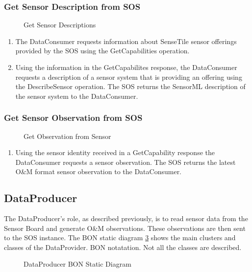 \documentclass[]{final_report}
\begin{document}
\subsubsection{Get Sensor Description from SOS}
\begin{figure}[h]
\centering
{}
\caption{Get Sensor Descriptions}\label{fig:GetMeta}
\end{figure}
 \begin{enumerate}
\item The DataConsumer requests information about SenseTile sensor offerings provided by the SOS using the GetCapabilities operation.
\item Using the information in the GetCapabilites response, the DataConsumer requests a description of a sensor system that is providing an offering using the DescribeSensor operation. The SOS returns the SensorML description of the sensor system to the DataConsumer.
\end{enumerate}

\subsubsection{Get  Sensor Observation from SOS}
\begin{figure}[h]
\centering
{}
\caption{Get Observation from Sensor}\label{fig:GetObs}
\end{figure}
 \begin{enumerate}
\item Using the sensor identity received in a GetCapability response the DataConsumer requests a sensor observation. The SOS returns the latest O\&M format sensor observation to the DataConsumer.
\end{enumerate}


\newpage
\subsection{DataProducer}\label{DataProducerHigh}
The DataProducer's role, as described previously, is to read sensor data from the Sensor Board and generate O\&M observations. These observations are then sent to the SOS instance. The BON static diagram \ref{fig:bon_static_diagam_producer.png}
 shows the main clusters and classes of the DataProvider. BON notatation. Not all the classes are described.
\begin{figure}[h]
\centering
{}
\caption{DataProducer BON Static Diagram}\label{fig:bon_static_diagam_producer.png}
\end{figure}
\end{document}

